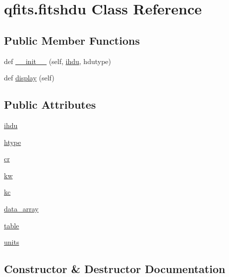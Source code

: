 \hypertarget{classqfits_1_1fitshdu}{}\section{qfits.\+fitshdu Class Reference}
\label{classqfits_1_1fitshdu}
\subsection*{Public Member Functions}
\begin{DoxyCompactItemize}
\item 
def \hyperlink{classqfits_1_1fitshdu_abeeaf1c62459ade0b2c34d66cc60bb1c}{\+\_\+\+\_\+init\+\_\+\+\_\+} (self, \hyperlink{classqfits_1_1fitshdu_a77a5c8160976e451214cc39d57e27576}{ihdu}, hdutype)
\item 
def \hyperlink{classqfits_1_1fitshdu_a5e5c34f9b2f49bbdb8b3ab3f98384b52}{display} (self)
\end{DoxyCompactItemize}
\subsection*{Public Attributes}
\begin{DoxyCompactItemize}
\item 
\hyperlink{classqfits_1_1fitshdu_a77a5c8160976e451214cc39d57e27576}{ihdu}
\item 
\hyperlink{classqfits_1_1fitshdu_aa7094664c3547e5c9729d72f0e240a2e}{htype}
\item 
\hyperlink{classqfits_1_1fitshdu_a1781bbe89501c65b782bc42c062a9cbe}{cr}
\item 
\hyperlink{classqfits_1_1fitshdu_afb23b78ade0154fe4d1b0c6e92adfd12}{kw}
\item 
\hyperlink{classqfits_1_1fitshdu_ae124aa56e844b00e87f6191799eaa421}{kc}
\item 
\hyperlink{classqfits_1_1fitshdu_a936e5d4bd77cc5d1a17c65d2e5d68a8f}{data\+\_\+array}
\item 
\hyperlink{classqfits_1_1fitshdu_ac4a3243bf29f297426e218093d4640ca}{table}
\item 
\hyperlink{classqfits_1_1fitshdu_ab91f44f5ccbca3a45109ba487642a4c0}{units}
\end{DoxyCompactItemize}


\subsection{Constructor \& Destructor Documentation}
\mbox{\label{classqfits_1_1fitshdu_abeeaf1c62459ade0b2c34d66cc60bb1c}} 
